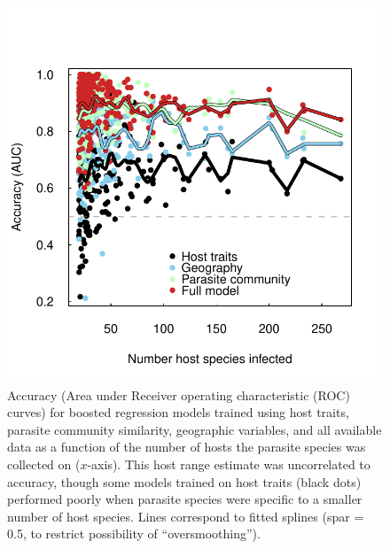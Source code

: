 \documentclass[12pt]{article}
\begin{document}
 
 
\begin{figure}[h]
  \includegraphics[width=\textwidth]{../Figures/hostNumAccuracy.pdf}
  \caption{Accuracy (Area under Receiver operating characteristic (ROC) curves) for boosted regression models trained using host traits, parasite community similarity, geographic variables, and all available data as a function of the number of hosts the parasite species was collected on ($x$-axis). This host range estimate was uncorrelated to accuracy, though some models trained on host traits (black dots) performed poorly when parasite species were specific to a smaller number of host species. Lines correspond to fitted splines (spar = 0.5, to restrict possibility of ``oversmoothing''). }
 \label{fig:HostNum}
 \end{figure}

 
 
 
\end{document}
